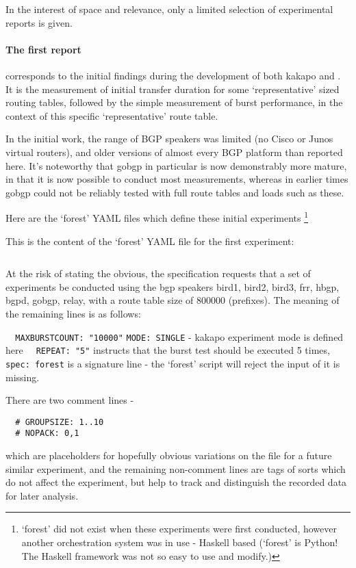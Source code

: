 In the interest of space and relevance, only a limited selection of experimental reports is given.

\paragraph{The first report} corresponds to the initial findings during the development of both kakapo and \hbgp.
It is the measurement of initial transfer duration for some `representative' sized routing tables, followed by the simple measurement of burst performance, in the context of this specific `representative'  route table.

In the initial work, the range of BGP speakers was limited (no Cisco or Junos virtual routers), and older versions of almost every BGP platform than reported here.  It's noteworthy that gobgp in particular is now demonstrably more mature, in that it is now possible to conduct most measurements, whereas in earlier times gobgp could not be reliably tested with full route tables and loads such as these.

Here are the `forest' YAML files which define these initial experiments \footnote{`forest' did not exist when these experiments were first conducted, however another orchestration system was in use - Haskell based (`forest' is Python!  The Haskell framework was not so easy to use and modify.) }

This is the content of the `forest' YAML file for the first experiment: \inputminted{yaml}{specs/burst1.yaml}


At the risk of stating the obvious, the specification requests that a set of experiments be conducted using the bgp speakers bird1, bird2, bird3, frr, hbgp, bgpd, gobgp, relay, with a route table size of 800000 (prefixes).
The meaning of the remaining lines is as follows:

\verb|  MAXBURSTCOUNT: "10000"|
\verb|MODE: SINGLE| - kakapo experiment mode is defined here
\verb*|  REPEAT: "5"| instructs that the burst test should be executed 5 times,
\verb|spec: forest| is a signature line - the `forest' script will reject the input of it is missing.

There are two comment lines - 
\begin{verbatim}
  # GROUPSIZE: 1..10
  # NOPACK: 0,1    
\end{verbatim}

which are placeholders for hopefully obvious variations on the file for a future similar experiment, and the remaining non-comment lines are tags of sorts which do not affect the experiment, but help to track and distinguish the recorded data for later analysis.

